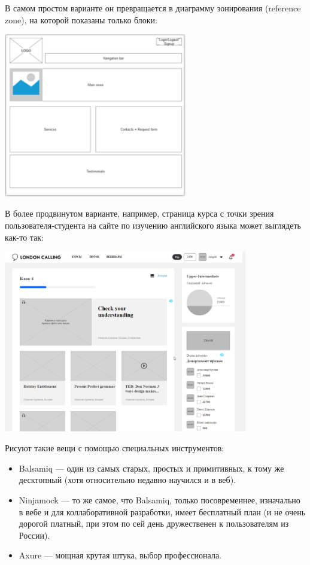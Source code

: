\documentclass{../../text-style}
\begin{document}
В самом простом варианте он превращается в диаграмму зонирования (reference zone), на которой показаны только блоки:

\begin{center}
    \includegraphics[width=0.6\textwidth]{wireframe.png}
\end{center}

В более продвинутом варианте, например, страница курса с точки зрения пользователя-студента на сайте по изучению английского языка может выглядеть как-то так:

\begin{center}
    \includegraphics[width=0.8\textwidth]{languageServiceWireframe.png}
\end{center}

Рисуют такие вещи с помощью специальных инструментов:

\begin{itemize}
    \item Balsamiq --- один из самых старых, простых и примитивных, к тому же десктопный (хотя относительно недавно научился и в веб).
    \item Ninjamock --- то же самое, что Balsamiq, только посовременнее, изначально в вебе и для коллаборативной разработки, имеет бесплатный план (и не очень дорогой платный, при этом по сей день дружественен к пользователям из России).
    \item Axure --- мощная крутая штука, выбор профессионала.
\end{itemize}
\end{document}
